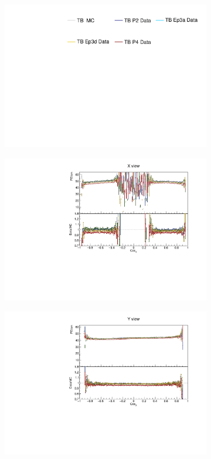 \begin{figure}[!ht]
  \begin{subfigure}{\textwidth}
  \centering
    \includegraphics[height=0.2\linewidth]{essentialsec_tb/legend.pdf}
  \end{subfigure}
  \vspace*{2mm}

  \begin{subfigure}{0.495\textwidth}
    \includegraphics[width=\linewidth]{PlotsAngularDistribution/pecm_cosx_x.pdf}
  \end{subfigure}
  \begin{subfigure}{0.495\textwidth}
    \includegraphics[width=\linewidth]{PlotsAngularDistribution/pecm_cosx_y.pdf}

\end{subfigure}
\end{figure}
